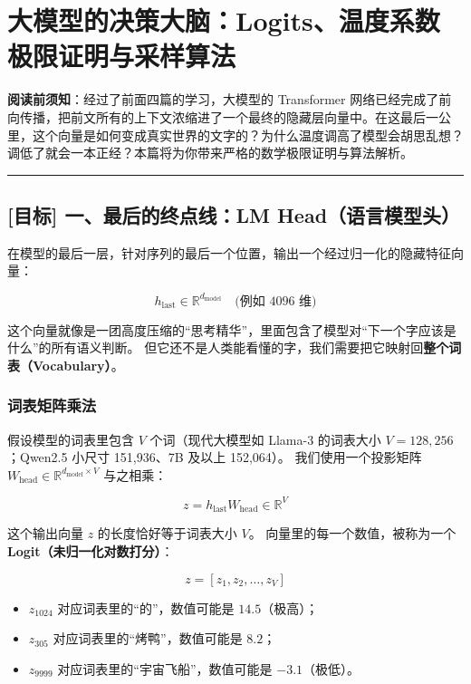 \chapter{大模型的决策大脑：Logits、温度系数极限证明与采样算法}

\begin{mathBox}[核心数学定理推导]
\textbf{阅读前须知}：经过了前面四篇的学习，大模型的 Transformer 网络已经完成了前向传播，把前文所有的上下文浓缩进了一个最终的隐藏层向量中。在这最后一公里，这个向量是如何变成真实世界的文字的？为什么温度调高了模型会胡思乱想？调低了就会一本正经？本篇将为你带来严格的数学极限证明与算法解析。
\end{mathBox}

\vspace{0.8em}\hrule\vspace{0.8em}

\section{[目标] 一、最后的终点线：LM Head（语言模型头）}

在模型的最后一层，针对序列的最后一个位置，输出一个经过归一化的隐藏特征向量：

\[
h_{\text{last}} \in \mathbb{R}^{d_{\text{model}}} \quad \text{(例如 } 4096 \text{ 维)}
\]

这个向量就像是一团高度压缩的“思考精华”，里面包含了模型对“下一个字应该是什么”的所有语义判断。
但它还不是人类能看懂的字，我们需要把它映射回\textbf{整个词表（Vocabulary）}。

\subsection{词表矩阵乘法}

假设模型的词表里包含 $V$ 个词（现代大模型如 Llama-3 的词表大小 $V = 128,256$；Qwen2.5 小尺寸 151,936、7B 及以上 152,064）。
我们使用一个投影矩阵 $W_{\text{head}} \in \mathbb{R}^{d_{\text{model}} \times V}$ 与之相乘：

\[
z = h_{\text{last}} W_{\text{head}} \in \mathbb{R}^V
\]

这个输出向量 $z$ 的长度恰好等于词表大小 $V$。
向量里的每一个数值，被称为一个 \textbf{Logit（未归一化对数打分）}：

\[
z = [z_1, z_2, \dots, z_V]
\]

\begin{itemize}
  \item $z_{1024}$ 对应词表里的“的”，数值可能是 $14.5$（极高）；
  \item $z_{305}$ 对应词表里的“烤鸭”，数值可能是 $8.2$；
  \item $z_{9999}$ 对应词表里的“宇宙飞船”，数值可能是 $-3.1$（极低）。
\end{itemize}


